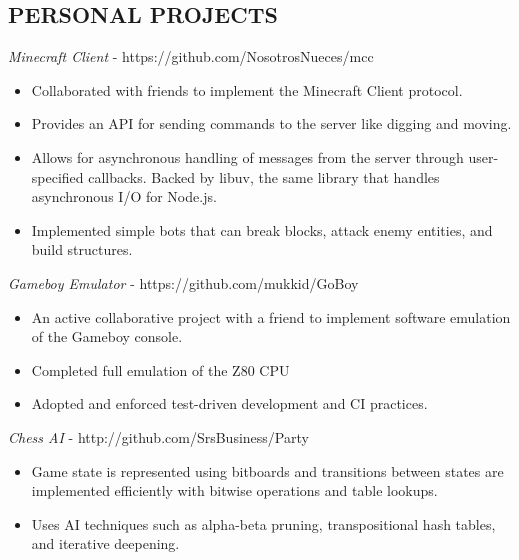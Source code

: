 \documentclass[overlapped, 10pt]{res} %
\begin{document}
\begin{resume}

\section{PERSONAL PROJECTS}
{\sl Minecraft Client} - https://github.com/NosotrosNueces/mcc
\begin{itemize} \itemsep -2pt %
    \item Collaborated with friends to implement the Minecraft Client protocol.
    \item Provides an API for sending commands to the server like digging and moving.
    \item Allows for asynchronous handling of messages from the server through user-specified callbacks. Backed by libuv, the same library that handles asynchronous I/O for Node.js.
    \item Implemented simple bots that can break blocks, attack enemy entities, and build structures.
\end{itemize}
{\sl Gameboy Emulator} - https://github.com/mukkid/GoBoy
\begin{itemize} \itemsep -2pt %
    \item An active collaborative project with a friend to implement software emulation of the Gameboy console.
    \item Completed full emulation of the Z80 CPU
    \item Adopted and enforced test-driven development and CI practices.
\end{itemize}
{\sl Chess AI} - http://github.com/SrsBusiness/Party
\begin{itemize} \itemsep -2pt %
    \item Game state is represented using bitboards and transitions between states are implemented efficiently with bitwise operations and table lookups.
    \item Uses AI techniques such as alpha-beta pruning, transpositional hash tables, and iterative deepening.
\end{itemize}

\end{resume}
\end{document}
